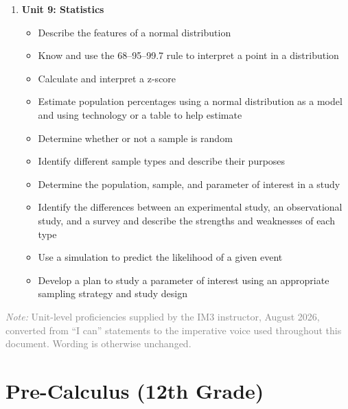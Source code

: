 \documentclass[11pt]{article}
\newcommand{\was}[1]{\newline{\small\textcolor{gray}{\textit{was:} #1}}}
\newcommand{\revnote}[1]{\par\medskip
  {\small\textcolor{gray}{\textit{Note:} #1}}}
\begin{document}
\begin{enumerate}[itemsep=6pt]
\item \textbf{Unit 9: Statistics}
      \was{Unit 9: Optimization}
  \begin{itemize}[nosep,leftmargin=1.5em]
  \item Describe the features of a normal distribution
  \item Know and use the 68--95--99.7 rule to interpret a point in a distribution
  \item Calculate and interpret a z-score
  \item Estimate population percentages using a normal distribution as a model and
        using technology or a table to help estimate
  \item Determine whether or not a sample is random
  \item Identify different sample types and describe their purposes
  \item Determine the population, sample, and parameter of interest in a study
  \item Identify the differences between an experimental study, an observational
        study, and a survey and describe the strengths and weaknesses of each type
  \item Use a simulation to predict the likelihood of a given event
  \item Develop a plan to study a parameter of interest using an appropriate sampling
        strategy and study design
  \end{itemize}

\end{enumerate}
\revnote{Unit-level proficiencies supplied by the IM3 instructor, August 2026,
  converted from ``I can'' statements to the imperative voice used throughout this
  document. Wording is otherwise unchanged.}

\section{Pre-Calculus (12th Grade)}
\end{document}
